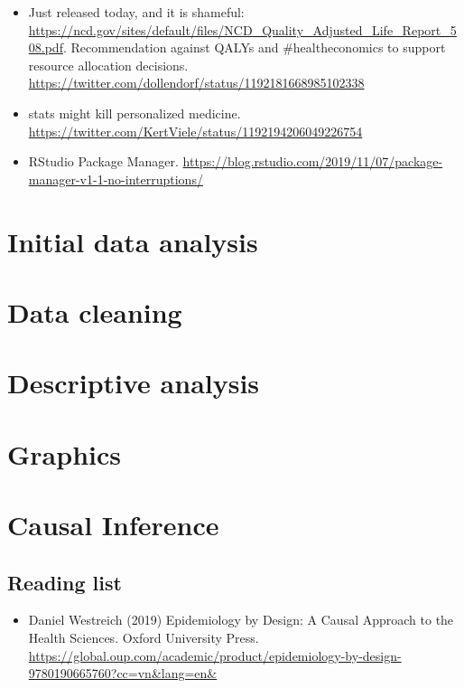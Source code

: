 \documentclass[]{book}
\providecommand{\tightlist}{%
  \setlength{\itemsep}{0pt}\setlength{\parskip}{0pt}}
\begin{document}
\begin{itemize}
\item
  Just released today, and it is shameful: \url{https://ncd.gov/sites/default/files/NCD_Quality_Adjusted_Life_Report_508.pdf}. Recommendation against QALYs and \#healtheconomics to support resource allocation decisions. \url{https://twitter.com/dollendorf/status/1192181668985102338}
\item
  stats might kill personalized medicine. \url{https://twitter.com/KertViele/status/1192194206049226754}
\item
  RStudio Package Manager. \url{https://blog.rstudio.com/2019/11/07/package-manager-v1-1-no-interruptions/}
\end{itemize}

\hypertarget{ida}{%
\chapter{Initial data analysis}\label{ida}}

\hypertarget{DataCleaning}{%
\chapter{Data cleaning}\label{DataCleaning}}

\hypertarget{DescriptiveAnalysis}{%
\chapter{Descriptive analysis}\label{DescriptiveAnalysis}}

\hypertarget{graphics}{%
\chapter{Graphics}\label{graphics}}

\hypertarget{CausalInference}{%
\chapter{Causal Inference}\label{CausalInference}}

\hypertarget{reading-list}{%
\section{Reading list}\label{reading-list}}

\begin{itemize}
\tightlist
\item
  Daniel Westreich (2019) Epidemiology by Design: A Causal Approach to the Health Sciences. Oxford University Press. \url{https://global.oup.com/academic/product/epidemiology-by-design-9780190665760?cc=vn\&lang=en\&}
\end{itemize}
\end{document}
